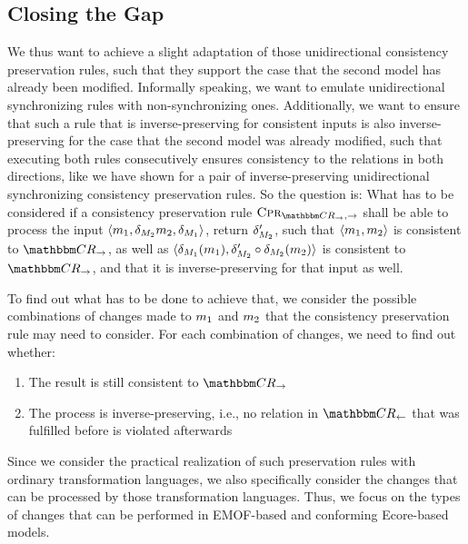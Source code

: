 \subsection{Closing the Gap}

We thus want to achieve a slight adaptation of those unidirectional consistency preservation rules, such that they support the case that the second model has already been modified.
Informally speaking, we want to emulate unidirectional synchronizing rules with non-synchronizing ones.
Additionally, we want to ensure that such a rule that is inverse-preserving for consistent inputs is also inverse-preserving for the case that the second model was already modified, such that executing both rules consecutively ensures consistency to the relations in both directions, like we have shown for a pair of inverse-preserving unidirectional synchronizing consistency preservation rules.
So the question is:
What has to be considered if a consistency preservation rule $\consistencypreservationrule{\consistencyrelationset{CR}_{\rightarrow},\rightarrow}$ shall be able to process the input $\langle m_{1},\delta_{M_{2}}m_{2},\delta_{M_{1}} \rangle$, return $\delta_{M_{2}}'$, such that $\langle m_{1},m_{2} \rangle$ is consistent to $\consistencyrelationset{CR}_{\rightarrow}$, as well as $\langle \delta_{M_{1}}(m_{1}),\delta_{M_{2}}' \circ \delta_{M_{2}}(m_{2}) \rangle$ is consistent to $\consistencyrelationset{CR}_{\rightarrow}$, and that it is inverse-preserving for that input as well.

To find out what has to be done to achieve that, we consider the possible combinations of changes made to $m_{1}$ and $m_{2}$ that the consistency preservation rule may need to consider.
For each combination of changes, we need to find out whether:
\begin{enumerate}
    \item The result is still consistent to $\consistencyrelationset{CR}_{\rightarrow}$
    \item The process is inverse-preserving, i.e., no relation in $\consistencyrelationset{CR}_{\leftarrow}$ that was fulfilled before is violated afterwards
\end{enumerate}

Since we consider the practical realization of such preservation rules with ordinary transformation languages, we also specifically consider the changes that can be processed by those transformation languages.
Thus, we focus on the types of changes that can be performed in EMOF-based and conforming Ecore-based models.

